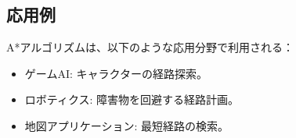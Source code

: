 \subsection*{応用例}
A*アルゴリズムは、以下のような応用分野で利用される：
\begin{itemize}
    \item ゲームAI: キャラクターの経路探索。
    \item ロボティクス: 障害物を回避する経路計画。
    \item 地図アプリケーション: 最短経路の検索。
\end{itemize}




